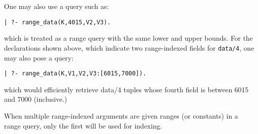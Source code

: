 One may also use a query such as:
\begin{verbatim}
| ?- range_data(K,4015,V2,V3).
\end{verbatim}
\noindent
which is treated as a range query with the same lower and upper
bounds.  For the declarations shown above, which indicate two
range-indexed fields for {\tt data/4}, one may also pose a query:

\begin{verbatim} 
| ?- range_data(K,V1,V2,V3:[6015,7000]).  
\end{verbatim} 

\noindent
 which would efficiently retrieve data/4 tuples whose fourth
field is between 6015 and 7000 (inclusive.)

When multiple range-indexed arguments are given ranges (or constants)
in a range query, only the first will be used for indexing.


